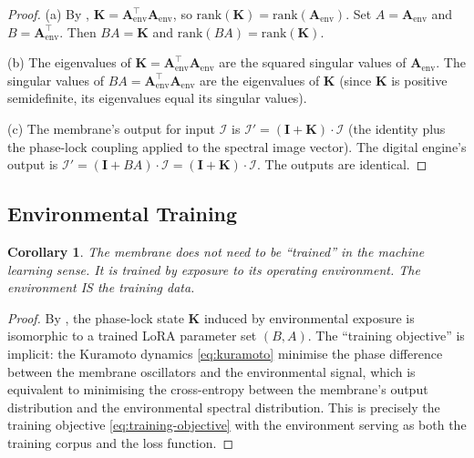 \documentclass[11pt,twocolumn,a4paper]{article}
\newtheorem{corollary}[theorem]{Corollary}
\theoremstyle{definition}
\theoremstyle{remark}
\begin{document}
\begin{proof}
(a) By , $\mathbf{K} = \mathbf{A}_{\mathrm{env}}^\top \mathbf{A}_{\mathrm{env}}$, so $\mathrm{rank}(\mathbf{K}) = \mathrm{rank}(\mathbf{A}_{\mathrm{env}})$.  Set $A = \mathbf{A}_{\mathrm{env}}$ and $B = \mathbf{A}_{\mathrm{env}}^\top$.  Then $BA = \mathbf{K}$ and $\mathrm{rank}(BA) = \mathrm{rank}(\mathbf{K})$.

(b) The eigenvalues of $\mathbf{K} = \mathbf{A}_{\mathrm{env}}^\top \mathbf{A}_{\mathrm{env}}$ are the squared singular values of $\mathbf{A}_{\mathrm{env}}$.  The singular values of $BA = \mathbf{A}_{\mathrm{env}}^\top \mathbf{A}_{\mathrm{env}}$ are the eigenvalues of $\mathbf{K}$ (since $\mathbf{K}$ is positive semidefinite, its eigenvalues equal its singular values).

(c) The membrane's output for input $\mathcal{I}$ is $\mathcal{I}' = (\mathbf{I} + \mathbf{K}) \cdot \mathcal{I}$ (the identity plus the phase-lock coupling applied to the spectral image vector).  The digital engine's output is $\mathcal{I}' = (\mathbf{I} + BA) \cdot \mathcal{I} = (\mathbf{I} + \mathbf{K}) \cdot \mathcal{I}$.  The outputs are identical.
\end{proof}

\subsection{Environmental Training}

\begin{corollary}\label{cor:env-training}
The membrane does not need to be ``trained'' in the machine learning sense.  It is trained by exposure to its operating environment.  The environment IS the training data.
\end{corollary}

\begin{proof}
By , the phase-lock state $\mathbf{K}$ induced by environmental exposure is isomorphic to a trained LoRA parameter set $(B, A)$.  The ``training objective'' is implicit: the Kuramoto dynamics \eqref{eq:kuramoto} minimise the phase difference between the membrane oscillators and the environmental signal, which is equivalent to minimising the cross-entropy between the membrane's output distribution and the environmental spectral distribution.  This is precisely the training objective \eqref{eq:training-objective} with the environment serving as both the training corpus and the loss function.
\end{proof}
\end{document}
